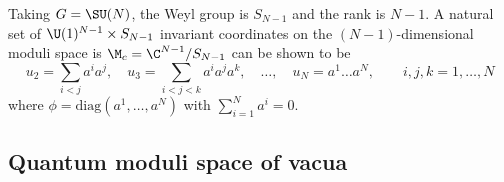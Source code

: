 \documentclass{worksheetclass}
\begin{document}
        \begin{examp}
            Taking $G=\SU(N)$, the Weyl group is $S_{N-1}$ and the rank is $N-1$. A natural set of $\U(1)^{N-1}\times S_{N-1}$ invariant coordinates on the $(N-1)$-dimensional moduli space is $\M_c=\C^{N-1}/S_{N-1}$ can be shown to be
            \begin{equation}
                u_2=\sum_{i<j}a^ia^j,\quad u_3=\sum_{i<j<k}a^ia^ja^k,\quad \dots,\quad u_N=a^1\dots a^N, \qquad i,j,k=1,\dots,N
            \end{equation}
            where $\phi=\text{diag}(a^1,\dots,a^N)$ with $\sum^N_{i=1} a^i=0$.
        \end{examp}

    \subsection{Quantum moduli space of vacua}
\end{document}
